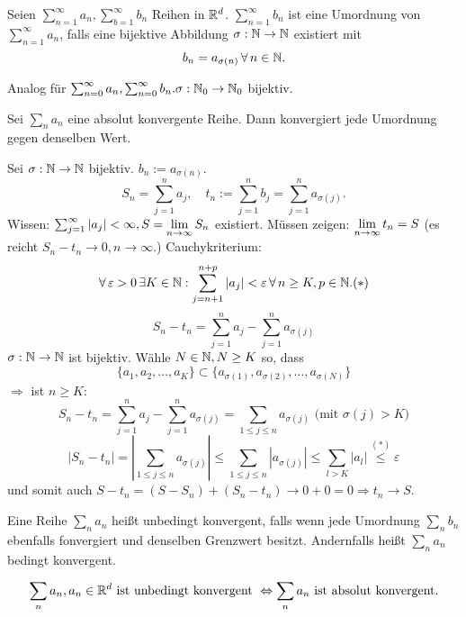 \documentclass[../ana1.tex]{subfiles}
\begin{document}
\begin{defi}[Umordnung]
    Seien \( \sum_{n=1}^\infty a_n, \sum_{b=1}^\infty b_n \) Reihen in \( \mathbb{R}^d \). \( \sum_{n=1}^\infty b_n \) ist eine Umordnung von \( \sum_{n=1}^\infty a_n \), falls eine bijektive Abbildung \( \sigma:\mathbb{N}\rightarrow\mathbb{N} \) existiert mit
    \[ b_n = a_{\sigma(n)} \,\forall \, n\in\mathbb{N}. \]
\end{defi}
\begin{bem}
    Analog für \( \sum_{n=0}^\infty a_n, \sum_{n=0}^\infty b_n. \sigma: \mathbb{N}_0 \rightarrow \mathbb{N}_0 \) bijektiv.
\end{bem}
\begin{satz}[Umordnungssatz]
    Sei \( \sum_n a_n \) eine absolut konvergente Reihe. Dann konvergiert jede Umordnung gegen denselben Wert.
\end{satz}
\begin{bew}
    Sei \( \sigma : \mathbb{N}\rightarrow\mathbb{N} \) bijektiv. \( b_n := a_{\sigma(n)} \).
    \[ S_n = \sum_{j=1}^n a_j, \quad t_n := \sum_{j=1}^n b_j = \sum_{j=1}^n a_{\sigma(j)}. \]
    Wissen: \( \sum_{j=1}^\infty |a_j| < \infty, S = \lim\limits_{n\rightarrow\infty} S_n \) existiert.
    Müssen zeigen: \( \lim\limits_{n\rightarrow\infty} t_n = S \) (es reicht \( S_n - t_n \rightarrow 0, n\rightarrow\infty \).)
    Cauchykriterium: 
    \[ \forall \, \varepsilon > 0 \, \exists K\in\mathbb{N}: \sum_{j=n+1}^{n+p} |a_j| < \varepsilon \,\forall \, n\geq K, p\in\mathbb{N}. (*) \]
    \[ S_n - t_n = \sum_{j=1}^n a_j - \sum_{j=1}^n a_{\sigma(j)} \]
    \( \sigma : \mathbb{N}\rightarrow\mathbb{N} \) ist bijektiv. Wähle \( N\in\mathbb{N}, N\geq K \) so, dass
    \[ \{ a_1, a_2, \ldots, a_K \} \subset \{ a_{\sigma(1)}, a_{\sigma(2)}, \ldots, a_{\sigma(N)} \} \]
    \( \Rightarrow \) ist \( n\geq K \):
    \[ S_n - t_n = \sum_{j=1}^n a_j - \sum_{j=1}^n a_{\sigma(j)} = \sum_{1\leq j \leq n} a_{\sigma(j)} \text{ (mit } \sigma(j) > K\text{)} \]
    \[ |S_n - t_n| = \left| \sum_{1\leq j \leq n} a_{\sigma(j)} \right| \leq \sum_{1\leq j \leq n} | a_{\sigma(j)} | \leq \sum_{l>K} |a_l| \overset{(*)}{\leq}\varepsilon \]
    und somit auch \( S - t_n = (S-S_n) + (S_n - t_n) \rightarrow 0 + 0 = 0 \Rightarrow t_n \rightarrow S \).
\end{bew}
\begin{bem}
    Eine Reihe \( \sum_n a_n \) heißt unbedingt konvergent, falls wenn jede Umordnung \( \sum_n b_n \) ebenfalls fonvergiert und denselben Grenzwert besitzt. Andernfalls heißt \( \sum_n a_n \) bedingt konvergent.
\end{bem}
\begin{satz*}[Dirichlet 1837]
    \[ \sum_n a_n, a_n \in\mathbb{R}^d \text{ ist unbedingt konvergent } \Leftrightarrow \sum_n a_n \text{ ist absolut konvergent.} \]
\end{satz*}
\end{document}
